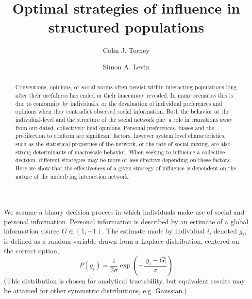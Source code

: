 \documentclass[3p,number,sort&compress,times]{elsarticle}
\begin{document}
\begin{frontmatter}
\title{Optimal strategies of influence in structured populations}
\author[ex]{Colin J. Torney}
\author[eeb]{Simon A. Levin}
%
\address[ex]{Centre for Mathematics \& the Environment, University of Exeter, Penryn Campus, Cornwall, UK}
\address[eeb]{Department of Ecology \& Evolutionary Biology, Princeton University, Princeton, NJ, USA}

\begin{abstract}
Conventions, opinions, or social norms often persist within interacting populations long after their usefulness has ended or their inaccuracy revealed. In many scenarios this is due to conformity by individuals, or the devaluation of individual preferences and opinions when they contradict observed social information. Both the behavior at the individual-level and the structure of the social network play a role in transitions away from out-dated, collectively-held opinions. Personal preferences, biases and the predilection to conform are significant factors, however system level characteristics, such as the statistical properties of the network, or the rate of social mixing, are also strong determinants of macroscale behavior. When seeking to influence a collective decision, different strategies may be more or less effective depending on these factors. Here we show that the effectiveness of a given strategy of influence is dependent on the nature of the underlying interaction network. 
\end{abstract}

\end{frontmatter}

We assume a binary decision process in which individuals make use of social and personal information. Personal information is described by an estimate of a global information source $G\in(1,-1)$. The estimate made by individual $i$, denoted $g_i$, is defined as a random variable drawn from a Laplace distribution, centered on the correct option,
\begin{equation}
P(g_i) = \frac{1}{2\sigma} \exp{ \left( - \frac{\vert g_i - G \vert}{\sigma} \right)}
\end{equation}
(This distribution is chosen for analytical tractability, but equivalent results may be attained for other symmetric distributions, e.g. Gaussian.)
\end{document}
